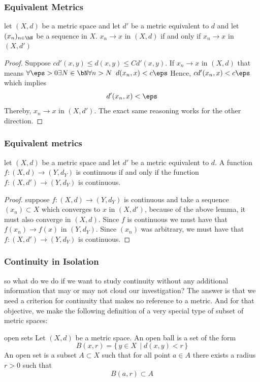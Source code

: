 \documentclass{beamer}
\begin{document}
\begin{frame}
    \frametitle{Equivalent Metrics}

    \begin{lemma}
        let $(X, d)$ be a metric space and let $d'$ be a metric equivalent to $d$ and let $(x_n)_{n\in\bN}$ be a sequence in $X$. 
        $x_n\to x$ in $(X, d)$ if and only if $x_n\to x$ in $(X, d')$
    \end{lemma}

    \begin{proof}
        Suppose $cd'(x, y)\leq d(x, y)\leq Cd'(x, y)$. If $x_n\to x$ in $(X, d)$ that means $\forall\eps>0\exists N\in\bN\forall n>N$ 
        $d(x_n, x)<c\eps$ \pause
        Hence, 
        $cd'(x_n, x)<c\eps$ 
        which implies
        \[d'(x_n, x)<\eps\]
        Thereby, $x_n\to x$ in $(X, d')$. The exact same reasoning works for the other direction.
    \end{proof}
\end{frame}

\begin{frame}
    \frametitle{Equivalent metrics}

    \begin{theorem}
        let $(X, d)$ be a metric space and let $d'$ be a metric equivalent to $d$. A function $f\colon(X, d) \longrightarrow (Y, d_Y)$
        is continuous if and only if the function $f\colon(X, d')\longrightarrow(Y, d_Y)$ is continuous.
    \end{theorem}\pause
    \begin{proof}
        suppose $f\colon (X, d)\longrightarrow (Y, d_Y)$ is continuous and take a sequence $(x_n)\subset X$ which converges to $x$ in 
        $(X, d')$, \pause because of the above lemma, it must also converge in $(X, d)$. \pause Since $f$ is continuous we must have that $f(x_n)\to f(x)$
        in $(Y, d_Y)$. \pause Since $(x_n)$ was arbitrary, we must have that $f\colon(X, d')\longrightarrow (Y, d_Y)$ is continuous.
    \end{proof}

\end{frame}

\begin{frame}
    \frametitle{Continuity in Isolation}

    so what do we do if we want to study continuity without any additional information that may or may not cloud our investigation? \pause
    The answer is that we need a criterion for continuity that makes no reference to a metric. And for that objective, we make the 
    following definition of a very special type of subset of metric spaces: \pause
    \begin{definition}{open sets}
        Let $(X, d)$ be a metric space. An open ball is a set of the form
        \[B(x, r) = \{\, y\in X\,\mid d(x, y)<r \,\}\] \pause
        An open set is a subset $A\subset X$ such that for all point $a\in A$ there exists a radius $r>0$ such that
        \[B(a, r)\subset A\]
    \end{definition}

\end{frame}
\end{document}
